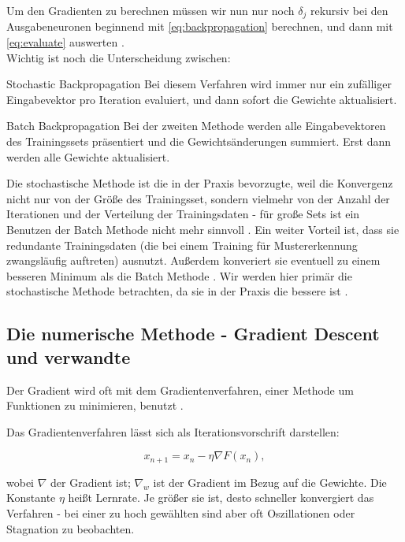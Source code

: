 Um den Gradienten zu berechnen müssen wir nun nur noch $\delta_j$ rekursiv bei den Ausgabeneuronen beginnend mit \ref{eq:backpropagation} berechnen, und dann mit \ref{eq:evaluate} auswerten \cite{bishop1995neural}. \\

Wichtig ist noch die Unterscheidung zwischen:

\begin{LaTeXdescription}
	\item[Stochastic Backpropagation]
	Bei diesem Verfahren wird immer nur ein zufälliger Eingabevektor pro Iteration evaluiert, und dann sofort die Gewichte aktualisiert. 
	\item[Batch Backpropagation] 
	Bei der zweiten Methode werden alle Eingabevektoren des Trainingssets präsentiert und die Gewichtsänderungen summiert. Erst dann werden alle Gewichte aktualisiert.\cite{duda2012pattern}
\end{LaTeXdescription}

Die stochastische Methode ist die in der Praxis bevorzugte, weil die Konvergenz nicht nur von der Größe des Trainingsset, sondern vielmehr von der Anzahl der Iterationen und der Verteilung der Trainingsdaten - für große Sets ist ein Benutzen der Batch Methode nicht mehr sinnvoll \cite{bengio2012practical}.
Ein weiter Vorteil ist, dass sie redundante Trainingsdaten (die bei einem Training für Mustererkennung zwangsläufig auftreten) ausnutzt. Außerdem konveriert sie eventuell zu einem besseren Minimum als die Batch Methode \cite{lecunefficient}.
Wir werden hier primär die stochastische Methode betrachten, da sie in der Praxis die bessere ist \cite{lecunefficient, bengio2012practical}.


\subsection{Die numerische Methode - Gradient Descent und verwandte}

Der Gradient wird oft mit dem Gradientenverfahren, einer Methode um Funktionen zu minimieren, benutzt \cite{bishop1995neural,bengio2012practical} 
.

Das Gradientenverfahren lässt sich als Iterationsvorschrift darstellen:

\begin{equation}
x_{n+1}=x_n- \eta  \nabla F(x_n), 
\end{equation}

wobei $\nabla$ der Gradient ist; $\nabla_w$ ist der Gradient im Bezug auf die Gewichte. 
Die Konstante $\eta$ heißt Lernrate. Je größer sie ist, desto schneller konvergiert das Verfahren - bei einer zu hoch gewählten sind aber oft Oszillationen oder Stagnation zu beobachten. 


